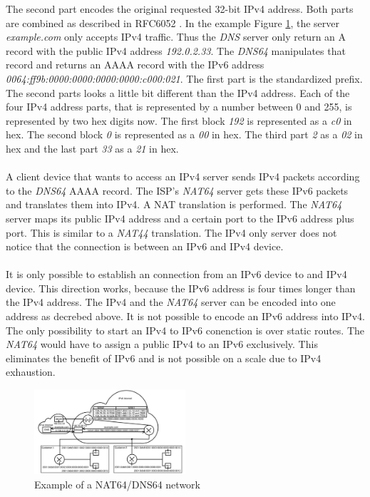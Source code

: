 \documentclass[format=sigconf, natbib=true, nonacm=true]{acmart}
\begin{document}
    The second part encodes the original requested 32-bit IPv4 address. Both parts are combined as described in RFC6052 \cite{rfc6052}. In the example Figure \ref{fig:nat_64_dns_64}, the server \textit{example.com} only accepts IPv4 traffic. Thus the \textit{DNS} server only return an A record with the public IPv4 address \textit{192.0.2.33}. The \textit{DNS64} manipulates that record and returns an AAAA record with the IPv6 address \textit{0064:ff9b:0000:0000:0000:0000:c000:021}. The first part is the standardized prefix. The second parts looks a little bit different than the IPv4 address. Each of the four IPv4 address parts, that is represented by a number between 0 and 255, is represented by two hex digits now. The first block \textit{192} is represented as a \textit{c0} in hex. The second block \textit{0} is represented as a \textit{00} in hex. The third part \textit{2} as a \textit{02} in hex and the last part \textit{33} as a \textit{21} in hex\cite{rfc6052}.\\\\A client device that wants to access an IPv4 server sends IPv4 packets according to the \textit{DNS64} AAAA record. The ISP's \textit{NAT64} server gets these IPv6 packets and translates them into IPv4. A NAT translation is performed. The \textit{NAT64} server maps its public IPv4 address and a certain port to the IPv6 address plus port. This is similar to a \textit{NAT44} translation. The IPv4 only server does not notice that the connection is between an IPv6 and IPv4 device.\\\\It is only possible to establish an connection from an IPv6 device to and IPv4 device. This direction works, because the IPv6 address is four times longer than the IPv4 address. The IPv4 and the \textit{NAT64} server can be encoded into one address as decrebed above. It is not possible to encode an IPv6 address into IPv4. The only possibility to start an IPv4 to IPv6 conenction is over static routes. The \textit{NAT64} would have to assign a public IPv4 to an IPv6 exclusively. This eliminates the benefit of IPv6 and is not possible on a scale due to IPv4 exhaustion\cite{rfc6146}.
    \begin{figure}
        \centering
        \includegraphics[width=0.5\textwidth]{images/nat_64_dns_64.png}
        \caption{Example of a NAT64/DNS64 network}
        \label{fig:nat_64_dns_64}
    \end{figure}
\end{document}
